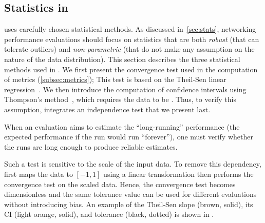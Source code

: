 \subsection{Statistics in \triscale}
\label{subsec:triscale_stats}

\triscale uses carefully chosen statistical methods.
As discussed in~\cref{sec:stats}, networking performance evaluations should focus on statistics that are both \emph{robust} (\ie that can tolerate outliers) and \emph{non-parametric} (\ie that do not make any assumption on the nature of the data distribution).
This section describes the three statistical methods used in \triscale. We first present the convergence test used in the computation of metrics (\cref{subsec:metrics});
This test is based on the \mbox{Theil-Sen} linear regression~\cite{theil1992RankInvariant, sen1968Estimates}.
We then introduce the computation of confidence intervals using Thompson's method~\cite{thompson1936Confidence}, which requires the data to be \iid. Thus, to verify this assumption, \triscale integrates an independence test that we present last.

\label{subsec:test_convergence}
When an evaluation aims to estimate the ``long-running'' performance (\ie the expected performance if the run would run “forever”), one must verify whether the runs are long enough to produce reliable estimates.


Such a test is sensitive to the scale of the input data.
To remove this dependency, \triscale first maps the data to $[-1, 1]$ using a linear transformation then performs the convergence test on the scaled data.
Hence, the convergence test becomes dimensionless and the same tolerance value can be used for different evaluations without introducing bias.
An example of the Theil-Sen slope (brown, solid), its CI (light orange, solid), and tolerance (black, dotted) is shown in .

